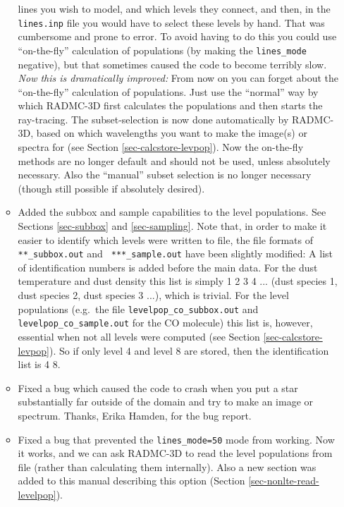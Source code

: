 \documentclass{report}
\begin{document}
\begin{itemize}
\begin{itemize}
    lines you wish to model, and which levels they connect, and then, in the
    {\small\tt lines.inp} file you would have to select these levels by
    hand. That was cumbersome and prone to error. To avoid having to do this
    you could use ``on-the-fly'' calculation of populations (by making the
    {\small\tt lines\_mode} negative), but that sometimes caused the code to
    become terribly slow. {\em Now this is dramatically improved:} From now
    on you can forget about the ``on-the-fly'' calculation of populations.
    Just use the ``normal'' way by which RADMC-3D first calculates the
    populations and then starts the ray-tracing. The subset-selection is now
    done automatically by RADMC-3D, based on which wavelengths you want to
    make the image(s) or spectra for (see Section
    \ref{sec-calcstore-levpop}). Now the on-the-fly methods are no longer
    default and should not be used, unless absolutely necessary. Also the
    ``manual'' subset selection is no longer necessary (though still
    possible if absolutely desired).
  \item Added the subbox and sample capabilities to the level populations.
    See Sections \ref{sec-subbox} and \ref{sec-sampling}. Note that, in
    order to make it easier to identify which levels were written to file,
    the file formats of {\small\tt ***\_subbox.out} and {\small\tt
      ***\_sample.out} have been slightly modified: A list of identification
    numbers is added before the main data. For the dust temperature and dust
    density this list is simply 1 2 3 4 ...  (dust species 1, dust species
    2, dust species 3 ...), which is trivial. For the level populations
    (e.g.\ the file {\small\tt levelpop\_co\_subbox.out} and {\small\tt
      levelpop\_co\_sample.out} for the CO molecule) this list is, however,
    essential when not all levels were computed (see Section
    \ref{sec-calcstore-levpop}). So if only level 4 and level 8 are stored,
    then the identification list is 4 8. 
  \item Fixed a bug which caused the code to crash when you put a star
    substantially far outside of the domain and try to make an image or
    spectrum. Thanks, Erika Hamden, for the bug report.
  \item Fixed a bug that prevented the {\small\tt lines\_mode=50} mode from
    working. Now it works, and we can ask RADMC-3D to read the level
    populations from file (rather than calculating them internally).  Also a
    new section was added to this manual describing this option (Section
    \ref{sec-nonlte-read-levelpop}).

\end{itemize}
\end{itemize}
\end{document}
